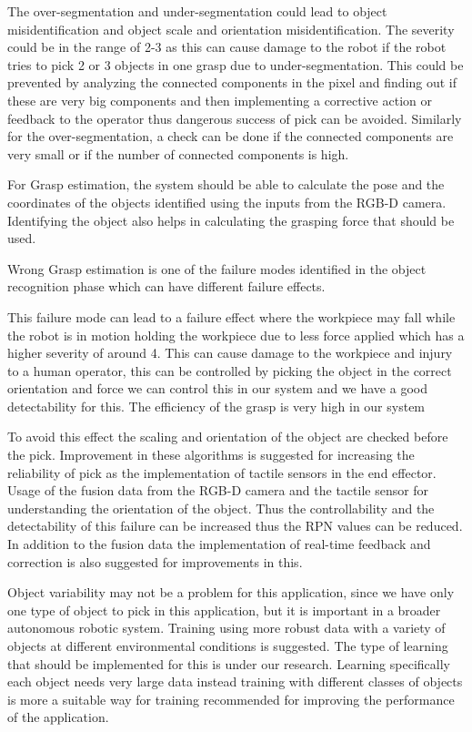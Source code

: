 {The over-segmentation and under-segmentation could lead to object misidentification and object scale and orientation misidentification. The severity could be in the range of 2-3 as this can cause damage to the robot if the robot tries to pick 2 or 3 objects in one grasp due to under-segmentation. This could be prevented by analyzing the connected components in the pixel and finding out if these are very big components and then implementing a corrective action or feedback to the operator thus dangerous success of pick can be avoided.  Similarly for the over-segmentation, a check can be done if the connected components are very small or if the number of connected components is high.

For Grasp estimation, the system should be able to calculate the pose and the coordinates of the objects identified using the inputs from the RGB-D camera. Identifying the object also helps in calculating the grasping force that should be used.

Wrong Grasp estimation is one of the failure modes identified in the object recognition phase which can have different failure effects. 

This failure mode can lead to a failure effect where the workpiece may fall while the robot is in motion holding the workpiece due to less force applied which has a higher severity of around 4. This can cause damage to the workpiece and injury to a human operator, this can be controlled by picking the object in the correct orientation and force we can control this in our system and we have a good detectability for this. The efficiency of the grasp is very high in our system

To avoid this effect the scaling and orientation of the object are checked before the pick. Improvement in these algorithms is suggested for increasing the reliability of pick as the implementation of tactile sensors in the end effector. Usage of the fusion data from the RGB-D camera and the tactile sensor for understanding the orientation of the object. Thus the controllability and the detectability of this failure can be increased thus the RPN values can be reduced. In addition to the fusion data the implementation of real-time feedback and correction is also suggested for improvements in this.

Object variability may not be a problem for this application, since we have only one type of object to pick in this application, but it is important in a broader autonomous robotic system. Training using more robust data with a variety of objects at different environmental conditions is suggested. The type of learning that should be implemented for this is under our research.   Learning specifically each object needs very large data instead training with different classes of objects is more a suitable way for training recommended for improving the performance of the application.






}
